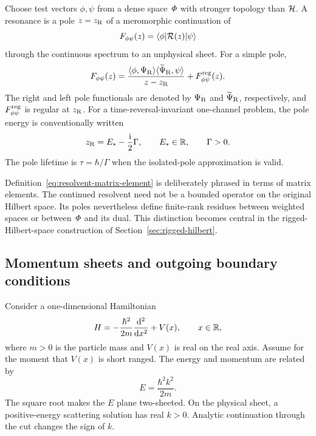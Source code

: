 Choose test vectors $\phi,\psi$ from a dense space $\mathit{\Phi}$ with stronger
topology than $\mathcal{H}$.  A resonance is a pole $z=z_{\mathrm{R}}$ of a
meromorphic continuation of
\begin{equation}
  F_{\phi\psi}(z)
  =\langle \phi \rvert\mathcal{R}(z)\lvert \psi \rangle
  \label{eq:resolvent-matrix-element}
\end{equation}
through the continuous spectrum to an unphysical sheet.  For a simple pole,
\begin{equation}
  F_{\phi\psi}(z)
  =\frac{\langle \phi,\Psi_{\mathrm{R}}\rangle
  \langle \widetilde{\Psi}_{\mathrm{R}},\psi\rangle}
  {z-z_{\mathrm{R}}}
  +F_{\phi\psi}^{\mathrm{reg}}(z) .
  \label{eq:resolvent-laurent}
\end{equation}
The right and left pole functionals are denoted by
$\Psi_{\mathrm{R}}$ and $\widetilde{\Psi}_{\mathrm{R}}$, respectively, and
$F_{\phi\psi}^{\mathrm{reg}}$ is regular at $z_{\mathrm{R}}$.  For a
time-reversal-invariant one-channel problem, the pole energy is conventionally
written
\begin{equation}
  z_{\mathrm{R}}=E_*-\frac{\mathrm{i}}{2}\Gamma,
  \qquad E_*\in\mathbb{R},
  \qquad \Gamma>0 .
  \label{eq:pole-energy}
\end{equation}
The pole lifetime is $\tau=\hbar/\Gamma$ when the isolated-pole approximation
is valid.

Definition~\eqref{eq:resolvent-matrix-element} is deliberately phrased in
terms of matrix elements.  The continued resolvent need not be a bounded
operator on the original Hilbert space.  Its poles nevertheless define
finite-rank residues between weighted spaces or between $\mathit{\Phi}$ and its
dual.  This distinction becomes central in the rigged-Hilbert-space
construction of Section~\ref{sec:rigged-hilbert}.

\subsection{Momentum sheets and outgoing boundary conditions}
\label{subsec:siegert}

Consider a one-dimensional Hamiltonian
\begin{equation}
  H=-\frac{\hbar^2}{2m}\frac{\mathrm{d}^2}{\mathrm{d} x^2}+V(x),
  \qquad x\in\mathbb{R},
  \label{eq:one-dimensional-H}
\end{equation}
where $m>0$ is the particle mass and $V(x)$ is real on the real axis.  Assume
for the moment that $V(x)$ is short ranged.  The energy and momentum are
related by
\begin{equation}
  E=\frac{\hbar^2k^2}{2m} .
  \label{eq:energy-momentum}
\end{equation}
The square root makes the $E$ plane two-sheeted.  On the physical sheet, a
positive-energy scattering solution has real $k>0$.  Analytic continuation
through the cut changes the sign of $k$.

